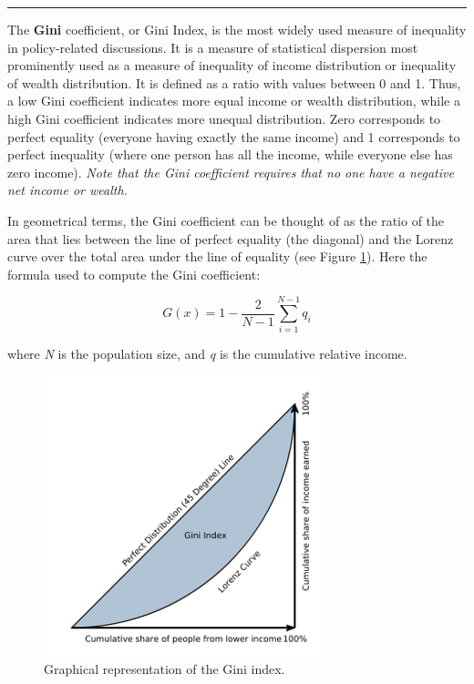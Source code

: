 \documentclass[
]{svmono}
\begin{document}
\begin{center}\rule{0.5\linewidth}{0.5pt}\end{center}

The \textbf{Gini} coefficient, or Gini Index, is the most widely used measure
of inequality in policy-related discussions. It is a measure of
statistical dispersion most prominently used as a measure of inequality
of income distribution or inequality of wealth distribution. It is
defined as a ratio with values between 0 and 1. Thus, a low Gini
coefficient indicates more equal income or wealth distribution, while a
high Gini coefficient indicates more unequal distribution. Zero
corresponds to perfect equality (everyone having exactly the same
income) and 1 corresponds to perfect inequality (where one person has
all the income, while everyone else has zero income). \emph{Note that the
Gini coefficient requires that no one have a negative net income or
wealth.}

In geometrical terms, the Gini coefficient can be thought of as the
ratio of the area that lies between the line of perfect equality (the
diagonal) and the Lorenz curve over the total area under the line of
equality (see Figure \ref{fig:gini}). Here the formula used to compute the Gini
coefficient:

\begin{equation}
G(x)=1-\frac{2}{N-1}\sum^{N-1}_{i=1}{q_i}
\label{eq:gini}
\end{equation}

where \emph{N} is the population size, and \emph{q} is the cumulative relative
income.

\begin{figure}[H]

{\centering \includegraphics[width=0.5\linewidth,]{images/gini} 

}

\caption{Graphical representation of the Gini index.}\label{fig:gini}
\end{figure}
\end{document}
